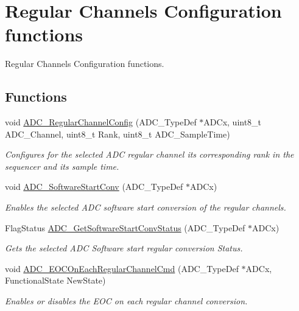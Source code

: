 \hypertarget{group___a_d_c___group4}{\section{Regular Channels Configuration functions}
\label{group___a_d_c___group4}
}


Regular Channels Configuration functions.  


\subsection*{Functions}
\begin{DoxyCompactItemize}
\item 
void \hyperlink{group___a_d_c___group4_gac531adb577b648d4bb8881f2ed627d52}{A\-D\-C\-\_\-\-Regular\-Channel\-Config} (A\-D\-C\-\_\-\-Type\-Def $\ast$A\-D\-Cx, uint8\-\_\-t A\-D\-C\-\_\-\-Channel, uint8\-\_\-t Rank, uint8\-\_\-t A\-D\-C\-\_\-\-Sample\-Time)
\begin{DoxyCompactList}\small\item\em Configures for the selected A\-D\-C regular channel its corresponding rank in the sequencer and its sample time. \end{DoxyCompactList}\item 
void \hyperlink{group___a_d_c___group4_gac1cd466e725595812c1bbfdad2459ff1}{A\-D\-C\-\_\-\-Software\-Start\-Conv} (A\-D\-C\-\_\-\-Type\-Def $\ast$A\-D\-Cx)
\begin{DoxyCompactList}\small\item\em Enables the selected A\-D\-C software start conversion of the regular channels. \end{DoxyCompactList}\item 
Flag\-Status \hyperlink{group___a_d_c___group4_gaf1119583782ecbcec380efcb7eb74883}{A\-D\-C\-\_\-\-Get\-Software\-Start\-Conv\-Status} (A\-D\-C\-\_\-\-Type\-Def $\ast$A\-D\-Cx)
\begin{DoxyCompactList}\small\item\em Gets the selected A\-D\-C Software start regular conversion Status. \end{DoxyCompactList}\item 
void \hyperlink{group___a_d_c___group4_ga5316caaa170415ef171c486d8f0bf22d}{A\-D\-C\-\_\-\-E\-O\-C\-On\-Each\-Regular\-Channel\-Cmd} (A\-D\-C\-\_\-\-Type\-Def $\ast$A\-D\-Cx, Functional\-State New\-State)
\begin{DoxyCompactList}\small\item\em Enables or disables the E\-O\-C on each regular channel conversion. \end{DoxyCompactList}\item 

\end{DoxyCompactItemize}
